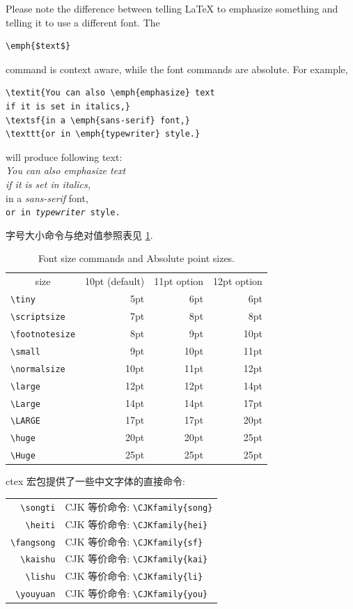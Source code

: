 \documentclass[a4paper,oneside]{book}
\begin{document}
Please note the difference between telling \LaTeX{} to emphasize something and telling it to use a different font. The
\begin{lstlisting}
\emph{$text$}
\end{lstlisting}
command is context aware, while the font commands are absolute. For example,
\begin{lstlisting}
\textit{You can also \emph{emphasize} text
if it is set in italics,}
\textsf{in a \emph{sans-serif} font,}
\texttt{or in \emph{typewriter} style.}
\end{lstlisting}
will produce following text:\\
\textit{You can also \emph{emphasize} text\\
if it is set in italics,}\\
\textsf{in a \emph{sans-serif} font,}\\
\texttt{or in \emph{typewriter} style.}

字号大小命令与绝对值参照表见 \cref{tab:FontsizeVSabsolutePoints}.
\begin{table}[!htbp]
    \centering
    \begin{tabular}{lrrr}
      \multicolumn{1}{c}{size}&10pt (default)&11pt option&12pt option\\
      \verb|\tiny|&5pt&6pt&6pt\\
      \verb|\scriptsize|&7pt&8pt&8pt\\
      \verb|\footnotesize|&8pt&9pt&10pt\\
      \verb|\small|&9pt&10pt&11pt\\
      \verb|\normalsize|&10pt&11pt&12pt\\
      \verb|\large|&12pt&12pt&14pt\\
      \verb|\Large|&14pt&14pt&17pt\\
      \verb|\LARGE|&17pt&17pt&20pt\\
      \verb|\huge|&20pt&20pt&25pt\\
      \verb|\Huge|&25pt&25pt&25pt
    \end{tabular}
  \caption{Font size commands and Absolute point sizes.}
  \label{tab:FontsizeVSabsolutePoints}
\end{table}


\textsf{ctex} 宏包提供了一些中文字体的直接命令:
\begin{table}
  \centering
  \begin{tabular}[h]{rl}
    \verb|\songti| & CJK 等价命令: \verb|\CJKfamily{song}|\\
    \verb|\heiti| & CJK 等价命令: \verb|\CJKfamily{hei}|\\
    \verb|\fangsong| & CJK 等价命令: \verb|\CJKfamily{sf}|\\
    \verb|\kaishu| & CJK 等价命令: \verb|\CJKfamily{kai}|\\
    \verb|\lishu| & CJK 等价命令: \verb|\CJKfamily{li}|\\
    \verb|\youyuan| & CJK 等价命令: \verb|\CJKfamily{you}|\\
  \end{tabular}
\end{table}
\end{document}
